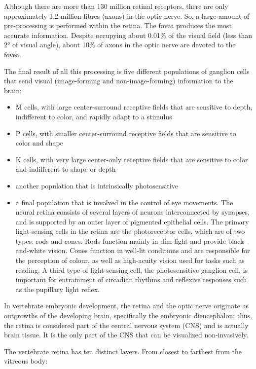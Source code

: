 \documentclass[]{book}
\providecommand{\tightlist}{%
  \setlength{\itemsep}{0pt}\setlength{\parskip}{0pt}}
\begin{document}
Although there are more than 130 million retinal receptors, there are only approximately 1.2 million fibres (axons) in the optic nerve. So, a large amount of pre-processing is performed within the retina. The fovea produces the most accurate information. Despite occupying about 0.01\% of the visual field (less than 2° of visual angle), about 10\% of axons in the optic nerve are devoted to the fovea.

The final result of all this processing is five different populations of ganglion cells that send visual (image-forming and non-image-forming) information to the brain:

\begin{itemize}
\tightlist
\item
  M cells, with large center-surround receptive fields that are sensitive to depth, indifferent to color, and rapidly adapt to a stimulus
\item
  P cells, with smaller center-surround receptive fields that are sensitive to color and shape
\item
  K cells, with very large center-only receptive fields that are sensitive to color and indifferent to shape or depth
\item
  another population that is intrinsically photosensitive
\item
  a final population that is involved in the control of eye movements.
  The neural retina consists of several layers of neurons interconnected by synapses, and is supported by an outer layer of pigmented epithelial cells. The primary light-sensing cells in the retina are the photoreceptor cells, which are of two types: rods and cones. Rods function mainly in dim light and provide black-and-white vision. Cones function in well-lit conditions and are responsible for the perception of colour, as well as high-acuity vision used for tasks such as reading. A third type of light-sensing cell, the photosensitive ganglion cell, is important for entrainment of circadian rhythms and reflexive responses such as the pupillary light reflex.
\end{itemize}

In vertebrate embryonic development, the retina and the optic nerve originate as outgrowths of the developing brain, specifically the embryonic diencephalon; thus, the retina is considered part of the central nervous system (CNS) and is actually brain tissue. It is the only part of the CNS that can be visualized non-invasively.

The vertebrate retina has ten distinct layers. From closest to farthest from the vitreous body:
\end{document}
